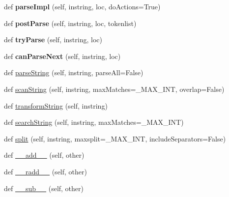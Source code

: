 \begin{DoxyCompactItemize}
def {\bfseries parse\+Impl} (self, instring, loc, do\+Actions=True)
\item 
\mbox{\label{classsetuptools_1_1__vendor_1_1pyparsing_1_1_parser_element_aa26027e65ffde65f6e6dedcc9dadac2d}} 
def {\bfseries post\+Parse} (self, instring, loc, tokenlist)
\item 
\mbox{\label{classsetuptools_1_1__vendor_1_1pyparsing_1_1_parser_element_a51e2e6e778178f5c669fb4ad6b1b8ded}} 
def {\bfseries try\+Parse} (self, instring, loc)
\item 
\mbox{\label{classsetuptools_1_1__vendor_1_1pyparsing_1_1_parser_element_ac88b6fc413a55ded2a2bc2c37c31561c}} 
def {\bfseries can\+Parse\+Next} (self, instring, loc)
\item 
def \hyperlink{classsetuptools_1_1__vendor_1_1pyparsing_1_1_parser_element_aadaa0a9ab4b6dd77f5363812a6d8f314}{parse\+String} (self, instring, parse\+All=False)
\item 
def \hyperlink{classsetuptools_1_1__vendor_1_1pyparsing_1_1_parser_element_a119bfc59496f168ee6d19cf781d83103}{scan\+String} (self, instring, max\+Matches=\+\_\+\+M\+A\+X\+\_\+\+I\+NT, overlap=False)
\item 
def \hyperlink{classsetuptools_1_1__vendor_1_1pyparsing_1_1_parser_element_af25c27f581e141385fae3884f19274e8}{transform\+String} (self, instring)
\item 
def \hyperlink{classsetuptools_1_1__vendor_1_1pyparsing_1_1_parser_element_a18ea0f1af4a045470230de54047b0ba5}{search\+String} (self, instring, max\+Matches=\+\_\+\+M\+A\+X\+\_\+\+I\+NT)
\item 
def \hyperlink{classsetuptools_1_1__vendor_1_1pyparsing_1_1_parser_element_a261b8172db2d9632b1945ecd174bd3eb}{split} (self, instring, maxsplit=\+\_\+\+M\+A\+X\+\_\+\+I\+NT, include\+Separators=False)
\item 
def \hyperlink{classsetuptools_1_1__vendor_1_1pyparsing_1_1_parser_element_ad846d0bf79031f29ae3e9aa6274db70c}{\+\_\+\+\_\+add\+\_\+\+\_\+} (self, other)
\item 
def \hyperlink{classsetuptools_1_1__vendor_1_1pyparsing_1_1_parser_element_abee68ac65a25d3a6d4e0fba4cdc8602c}{\+\_\+\+\_\+radd\+\_\+\+\_\+} (self, other)
\item 
def \hyperlink{classsetuptools_1_1__vendor_1_1pyparsing_1_1_parser_element_a1a9701f4c9c8821bdb02e36f6a758d9a}{\+\_\+\+\_\+sub\+\_\+\+\_\+} (self, other)

\end{DoxyCompactItemize}
